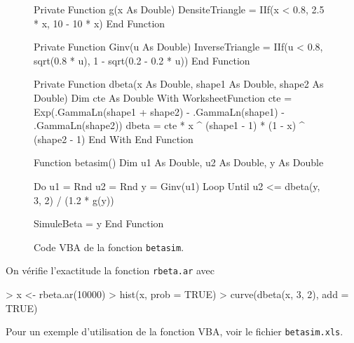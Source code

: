 \begin{exercice}
\begin{sol}
\begin{enumerate}
\begin{figure}
\begin{framed}
\begin{Scode}
Private Function g(x As Double)
    DensiteTriangle = IIf(x < 0.8, 2.5 * x,
                          10 - 10 * x)
End Function

Private Function Ginv(u As Double)
    InverseTriangle = IIf(u < 0.8, sqrt(0.8 * u),
                          1 - sqrt(0.2 - 0.2 * u))
End Function

Private Function dbeta(x As Double, shape1 As Double,
                       shape2 As Double)
    Dim cte As Double
    With WorksheetFunction
        cte = Exp(.GammaLn(shape1 + shape2) -
                  .GammaLn(shape1) -
                  .GammaLn(shape2))
        dbeta = cte * x ^ (shape1 - 1) *
                (1 - x) ^ (shape2 - 1)
    End With
End Function

Function betasim()
    Dim u1 As Double, u2 As Double, y As Double

    Do
        u1 = Rnd
        u2 = Rnd
        y = Ginv(u1)
    Loop Until u2 <= dbeta(y, 3, 2) / (1.2 * g(y))

    SimuleBeta = y
End Function
\end{Scode}
        \end{framed}
        \caption{Code VBA de la fonction \texttt{betasim}.}
        \label{fig:simulation:betasim}
      \end{figure}
      On vérifie l'exactitude la fonction \texttt{rbeta.ar} avec
\begin{Schunk}
\begin{Sinput}
> x <- rbeta.ar(10000)
> hist(x, prob = TRUE)
> curve(dbeta(x, 3, 2), add = TRUE)
\end{Sinput}
\end{Schunk}
      Pour un exemple d'utilisation de la fonction VBA, voir le fichier
      \texttt{betasim.xls}.
  \end{enumerate}
\end{sol}
\end{exercice}

